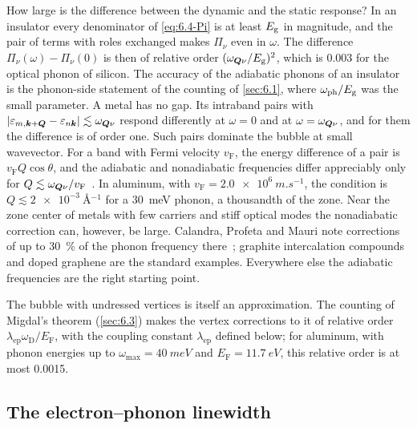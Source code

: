 How large is the difference between the dynamic and the static response? In an insulator every denominator of \cref{eq:6.4-Pi} is at least $E_{\mathrm{g}}$ in magnitude, and the pair of terms with roles exchanged makes $\Pi_\nu$ even in $\omega$. The difference $\Pi_\nu(\omega) - \Pi_\nu(0)$ is then of relative order $(\omega_{\bm{Q}\nu}/E_{\mathrm{g}})^2$, which is 0.003 for the optical phonon of silicon. The accuracy of the adiabatic phonons of an insulator is the phonon-side statement of the counting of \cref{sec:6.1}, where $\omega_{\mathrm{ph}}/E_{\mathrm{g}}$ was the small parameter. A metal has no gap. Its intraband pairs with $|\varepsilon_{m,\bm{k}+\bm{Q}} - \varepsilon_{n\bm{k}}| \lesssim \omega_{\bm{Q}\nu}$ respond differently at $\omega = 0$ and at $\omega = \omega_{\bm{Q}\nu}$, and for them the difference is of order one. Such pairs dominate the bubble at small wavevector. For a band with Fermi velocity $v_{\mathrm{F}}$, the energy difference of a pair is $v_{\mathrm{F}}Q\cos\theta$, and the adiabatic and nonadiabatic frequencies differ appreciably only for $Q \lesssim \omega_{\bm{Q}\nu}/v_{\mathrm{F}}$~\cite{calandra2010adiabatic}. In aluminum, with $v_{\mathrm{F}} = \SI{2.0e6}{m.s^{-1}}$, the condition is $Q \lesssim \SI{2e-3}{\angstrom^{-1}}$ for a \SI{30}{meV} phonon, a thousandth of the zone. Near the zone center of metals with few carriers and stiff optical modes the nonadiabatic correction can, however, be large. Calandra, Profeta and Mauri note corrections of up to \SI{30}{\percent} of the phonon frequency there~\cite{calandra2010adiabatic}; graphite intercalation compounds and doped graphene are the standard examples. Everywhere else the adiabatic frequencies are the right starting point.

The bubble with undressed vertices is itself an approximation. The counting of Migdal's theorem (\cref{sec:6.3}) makes the vertex corrections to it of relative order $\lambda_{\mathrm{ep}}\omega_{\mathrm{D}}/E_{\mathrm{F}}$, with the coupling constant $\lambda_{\mathrm{ep}}$ defined below; for aluminum, with phonon energies up to $\omega_{\max} = \SI{40}{meV}$ and $E_{\mathrm{F}} = \SI{11.7}{eV}$, this relative order is at most 0.0015.

\subsection{The electron--phonon linewidth}


